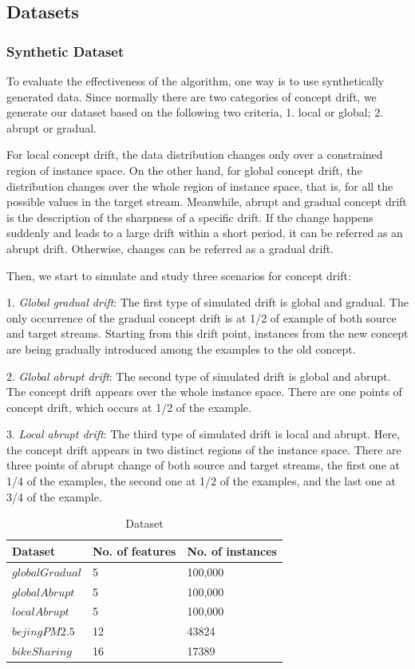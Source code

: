 \documentclass[conference,compsoc]{IEEEtran}
\begin{document}
\subsection{Datasets}
\subsubsection{Synthetic Dataset}
To evaluate the effectiveness of the algorithm, one way is to use synthetically generated data. Since normally there are two categories of concept drift, we generate our dataset based on the following two criteria, 1. local or global; 2. abrupt or gradual. 

For local concept drift, the data distribution changes only over a constrained region of instance space. On the other hand, for global concept drift, the distribution changes over the whole region of instance space, that is, for all the possible values in the target stream. Meanwhile, abrupt and gradual concept drift is the description of the sharpness of a specific drift. If the change happens suddenly and leads to a large drift within a short period, it can be referred as an abrupt drift. Otherwise, changes can be referred as a gradual drift.

Then, we start to simulate and study three scenarios for concept drift:

1. \emph{Global gradual drift}: The first type of simulated drift is global and gradual. The only occurrence of the gradual concept drift is at 1/2 of example of both source and target streams. Starting from this drift point, instances from the new concept are being gradually introduced among the examples to the old concept. 

2. \emph{Global abrupt drift}: The second type of simulated drift is global and abrupt. The concept drift appears over the whole instance space. There are one points of concept drift, which occurs at 1/2 of the example.

3. \emph{Local abrupt drift}: The third type of simulated drift is local and abrupt. Here, the concept drift appears in two distinct regions of the instance space. There are three points of abrupt change of both source and target streams, the first one at 1/4 of the examples, the second one at 1/2 of the examples, and the last one at 3/4 of the example.

\begin{table}[H]
\centering
\caption{Dataset}
\label{tab2}
\begin{tabular}{|l|l|l|}
\hline
 \bf{Dataset} & \bf{No. of features} & \bf{No. of instances} \\ \hline
 $globalGradual$ & 5 & 100,000\\ \hline
 $globalAbrupt$ & 5 & 100,000\\ \hline
 $localAbrupt$ & 5 & 100,000\\ \hline
 $bejingPM2.5$ & 12 & 43824 \\ \hline
 $bikeSharing$ & 16 & 17389 \\ \hline

\end{tabular}
\end{table}
\end{document}
